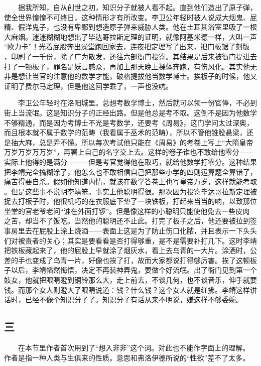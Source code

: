 　　据我所知，自从创世之初，知识分子就被人看不起。直到他们造出了原子弹， 使全世界惶惶不可终日，这种情形才有所改变。李卫公年轻时被人说成大烟鬼、屁 精、假洋鬼子，也没有卑鄙到想造原子弹来威胁人类。他在土耳其浴室里吸了一根 大麻烟。迷迷糊糊地想出了毕达哥拉斯定理的证明，就像阿基米德一样，大叫一声 “欧力卡”！光着屁股奔出澡堂跑回家去，连夜把定理写了出来，把门板锯了刻版 ，印刷了一千份，除了广为散发，还往六部衙门投寄。其结果是后来被衙门提进去 打了一顿板子，罪名是妖言惑众，再加上那天晚上裸体奔跑，有伤风化。其实他无 非是想让当官的注意他的数学才能，破格提拔他当数学博士。挨板子的时候，他又 证明了费尔马定理，但是他这回学乖了，一声也没吭。 

　　李卫公年轻时在洛阳城里。总想考数学博士，然后就可以领一份官俸，不必到街上当流氓。这是知识分子的正经出路。但是他总是考不取。这倒不是因为他数学不够精通，而是因为考博士不光是考数学，还要考《周易》，这门学问太过深奥， 而且根本就不属于数学的范畴（我看属于巫术的范畴），所以不管他锥股悬梁，还是抽大麻，总是弄不懂。所以每次考试他只能在《周易》的考卷上写上“大隋皇帝 万岁万岁万万岁”，再署上自己的名字交上去。这样的卷子谁也不敢给他零分—— 实际上他得的是满分———但是考官觉得他在取巧，就给他数学打零分。这种结果 把李靖完全搞糊涂了，他怎么也不敢相信自己把那些小学的四则运算题全算错了， 痛苦得要自杀。假如他知道内情，就该在数学答卷上也写皇帝万岁，这样就能考取 。但是这些事不说明李靖笨。事实上他聪明得很。那次因为投寄毕达哥拉斯定理被 捉去打板子时，他很机巧的在衣服底下垫了一块铁板，打起来当当的响，以致那位 坐堂的官老爷老问“谁在外面打锣”。但是像这样的小聪明只能使他免去一些皮肉 之苦，却当不了饭吃。当然他的聪明还不止此。打完了板子之后，他还要被拉到签 事房里去在屁股上涂上烧酒——表面上这是为了防止伤口化脓，并且表示一下头头 们对被责者的关心；其实是要看看是否打得够重，是不是需要补打几下。这时李靖 把铁板藏起来了，他的屁股上早就涂了烟灰水，看上去乌青的一大片。涂酒时，公 差的手也变成了乌青一片，好像也挨了打，故而大家都说打得够厉害。挨了这顿板 子以后，李靖幡然悔悟，决定不再装神弄鬼，要做个好流氓。出了衙门见到第一个 妓女，他就把眼睛瞪到铜铃那么大，走上前去，不谈几何，也不谈音乐，伸手就要 钱。而那个女人则瞪大了眼睛说道：钱？什么钱？这个女人就是红拂。李靖这样讲 话时，已经不像个知识分子了。知识分子有话从来不明说，嫌这样不够委婉。 
 
 
\subsection{三} 
 
 　　在本节里作者首次用到了“想入非非”这个词。对此也不能作字面上的理解。 作者是指一种人类与生俱来的性质。意思和弗洛伊德所说的“性欲”差不了太多。 
 
